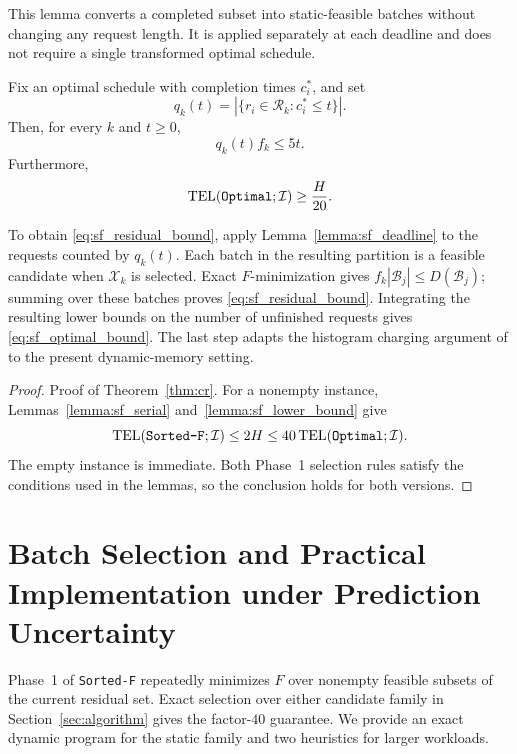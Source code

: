 \documentclass[nonblindrev]{informs3_hide}
\newcommand{\sortF}{\texttt{Sorted-F}}
\newcommand{\opt}{\texttt{Optimal}}
\begin{document}
This lemma converts a completed subset into static-feasible batches without
changing any request length. It is applied separately at each deadline and
does not require a single transformed optimal schedule.

\begin{lemma}
\label{lemma:sf_lower_bound}
Fix an optimal schedule with completion times $c_i^*$, and set
\[
    q_k(t)=|\{r_i\in\mathcal R_k:c_i^*\le t\}|.
\]
Then, for every $k$ and $t\ge0$,
\begin{equation}
\label{eq:sf_residual_bound}
    q_k(t)f_k\le5t.
\end{equation}
Furthermore,
\begin{equation}
\label{eq:sf_optimal_bound}
    \mathrm{TEL}(\textup{\opt};\mathcal I)\ge\frac{H}{20}.
\end{equation}
\end{lemma}

To obtain \eqref{eq:sf_residual_bound}, apply
Lemma~\ref{lemma:sf_deadline} to the requests counted by $q_k(t)$. Each batch
in the resulting partition is a feasible candidate when $\mathcal X_k$ is
selected. Exact $F$-minimization gives
$f_k|\mathcal B_j|\le D(\mathcal B_j)$; summing over these batches proves
\eqref{eq:sf_residual_bound}. Integrating the resulting lower bounds on the number of unfinished
requests gives \eqref{eq:sf_optimal_bound}. The last step adapts the histogram
charging argument of \citet{feige2004approximating} to the present
dynamic-memory setting.

\begin{proof}{Proof of Theorem~\ref{thm:cr}.}
For a nonempty instance, Lemmas~\ref{lemma:sf_serial}
and~\ref{lemma:sf_lower_bound} give
\[
    \mathrm{TEL}(\textup{\sortF};\mathcal I)
    \le2H
    \le40\,\mathrm{TEL}(\textup{\opt};\mathcal I).
\]
The empty instance is immediate. Both Phase~1 selection rules satisfy the
conditions used in the lemmas, so the conclusion holds for both versions.
\Halmos
\end{proof}


\section{Batch Selection and Practical Implementation under Prediction Uncertainty} \label{sec:approximation}

Phase~1 of \sortF{} repeatedly minimizes $F$ over nonempty feasible subsets
of the current residual set. Exact selection over either candidate family in
Section~\ref{sec:algorithm} gives the factor-$40$ guarantee. We provide an
exact dynamic program for the static family and two heuristics for larger
workloads.
\end{document}
